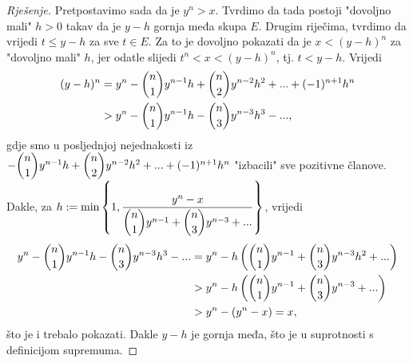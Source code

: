 \begin{proof}[Rješenje]
Pretpostavimo sada da je $y^n>x$. Tvrdimo da tada postoji "dovoljno mali" $h>0$ takav da je $y-h$ gornja međa skupa $E$. Drugim riječima, tvrdimo da vrijedi $t\leq y-h$ za sve $t\in E$. Za to je dovoljno pokazati da je $x<(y-h)^n$ za "dovoljno mali" $h$, jer odatle slijedi $t^n<x<(y-h)^n$, tj. $t<y-h$. Vrijedi
\begin{align*}
(y-h)^n&=y^n-\dbinom{n}{1}y^{n-1}h+\dbinom{n}{2}y^{n-2}h^2+...+(-1)^{n+1}h^n\\
&>y^n-\dbinom{n}{1}y^{n-1}h-\dbinom{n}{3}y^{n-3}h^3-...,
\end{align*}
gdje smo u posljednjoj nejednakosti iz $-\dbinom{n}{1}y^{n-1}h+\dbinom{n}{2}y^{n-2}h^2+...+(-1)^{n+1}h^n$ "izbacili" sve pozitivne članove. Dakle, za
$h:=\min\left\{1, \dfrac{y^n-x}{\dbinom{n}{1}y^{n-1}+\dbinom{n}{3}y^{n-3}+...}\right\}$,
vrijedi
\begin{align*}
y^n-\dbinom{n}{1}y^{n-1}h-\dbinom{n}{3}y^{n-3}h^3-...&=y^n-h\left(\dbinom{n}{1}y^{n-1}+\dbinom{n}{3}y^{n-3}h^2+...\right)\\
&>y^n-h\left(\dbinom{n}{1}y^{n-1}+\dbinom{n}{3}y^{n-3}+...\right)\\
&>y^n-\left(y^n-x\right)=x,
\end{align*}
što je i trebalo pokazati. Dakle $y-h$ je gornja međa, što je u suprotnosti s definicijom supremuma.
\end{proof}


